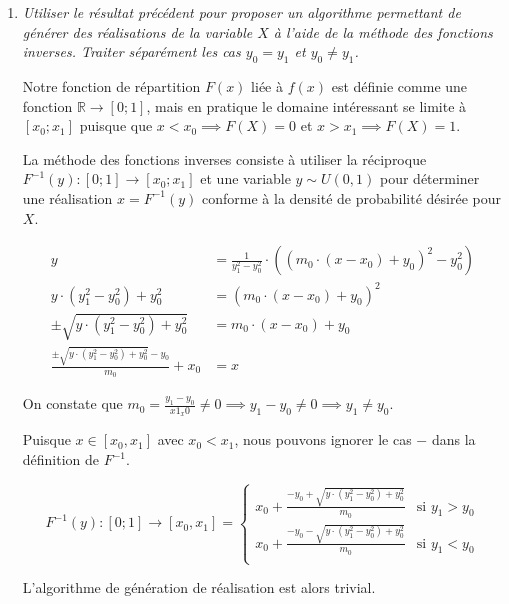 \documentclass[a4paper,11pt]{report}
\begin{document}
\begin{enumerate}[\indent a)]
{\em Le développement du point d) n'est pas demandé. }

\item {\em Utiliser le résultat précédent pour proposer un algorithme permettant de générer des réalisations de la variable $X$ à l'aide de la méthode des fonctions inverses. Traiter séparément les cas $y_{0} = y_{1}$ et $y_{0} \neq y_{1}$.}

Notre fonction de répartition $F(x)$ liée à $f(x)$ est définie comme une fonction $\mathbb{R} \rightarrow [0;1]$, mais en pratique le domaine intéressant se limite à $[x_0;x_1]$ puisque que $x < x_0 \implies F(X) = 0$ et $x > x_1 \implies F(X) = 1$.

La méthode des fonctions inverses consiste à utiliser la réciproque  $F^{-1}(y) : [0;1] \rightarrow [x_0;x_1]$ et une variable $y \sim U(0, 1)$ pour déterminer une réalisation $x = F^{-1}(y)$ conforme à la densité de probabilité désirée pour $X$.

\begingroup
\addtolength{\jot}{1em}
\begin{align*}
	y &= \frac{1}{y^2_1 - y^2_0} \cdot \left( \left( m_0 \cdot  \left( x - x_0 \right) + y_0 \right)^2 - y^2_0 \right) \\
	y \cdot (y_1^2 - y_0^2) + y^2_0 &=  \left( m_0 \cdot  \left( x - x_0 \right) + y_0 \right)^2\\
	\pm \sqrt{y \cdot (y_1^2 - y_0^2) + y^2_0} &=  m_0 \cdot  \left( x - x_0 \right) + y_0 \\
	\frac{\pm \sqrt{y \cdot (y_1^2 - y_0^2) + y^2_0} - y_0}{m_0} + x_0 &=  x
\end{align*}
\endgroup

On constate que $m_0 = \frac{y_1-y_0}{x1_x0} \ne 0 \implies y_1-y_0 \ne 0 \implies y_1 \ne y_0$.

Puisque $x \in [x_0,x_1]$ avec $x_0 < x_1$, nous pouvons ignorer le cas $-$ dans la définition de $F^{-1}$.

\begin{equation*}
	F^{-1}(y): [0;1] \rightarrow [x_0,x_1] = \left\lbrace \begin{array}{ll}
		x_0 + \frac{- y_0 + \sqrt{y \cdot (y_1^2 - y_0^2) + y^2_0}}{m_0}
		& \text{si $y_1 > y_0$} \\
		x_0 + \frac{- y_0 - \sqrt{y \cdot (y_1^2 - y_0^2) + y^2_0}}{m_0}
		& \text{si $y_1 < y_0$} \\
	\end{array} \right.
\end{equation*}

L'algorithme de génération de réalisation est alors trivial.


\end{enumerate}
\end{document}
